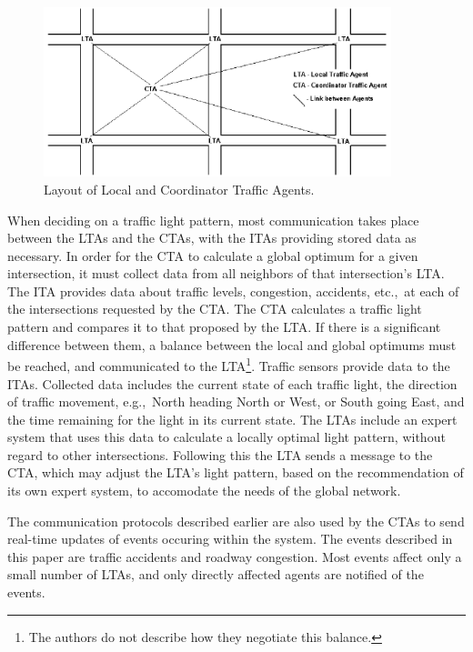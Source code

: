 \documentclass[11pt,letterpaper,onecolumn,twoside,openright,final]{report}
\begin{document}
\begin{figure}[h]
  \includegraphics[width=0.9\textwidth]{figures/LTAs-and-CTA.PNG}
  \caption{Layout of Local and Coordinator Traffic Agents.}
  \label{fig:LTAs-and-CTA}
\end{figure}


When deciding on a traffic light pattern, most communication takes place between the LTAs and the CTAs, with the ITAs providing stored data as necessary.
In order for the CTA to calculate a global optimum for a given intersection, it must collect data from all neighbors of that intersection's LTA.
The ITA provides data about traffic levels, congestion, accidents, etc.,~at each of the intersections requested by the CTA.
The CTA calculates a traffic light pattern and compares it to that proposed by the LTA.
If there is a significant difference between them, a balance between the local and global optimums must be reached, and communicated to the LTA\footnote{The authors do not describe how they negotiate this balance.}.
Traffic sensors provide data to the ITAs.
Collected data includes the current state of each traffic light, the direction of traffic movement, e.g.,~North heading North or West, or South going East, and the time remaining for the light in its current state.
The LTAs include an expert system that uses this data to calculate a locally optimal light pattern, without regard to other intersections.
Following this the LTA sends a message to the CTA, which may adjust the LTA's light pattern, based on the recommendation of its own expert system, to accomodate the needs of the global network.

The communication protocols described earlier are also used by the CTAs to send real-time updates of events occuring within the system.
The events described in this paper are traffic accidents and roadway congestion.
Most events affect only a small number of LTAs, and only directly affected agents are notified of the events.
\end{document}
